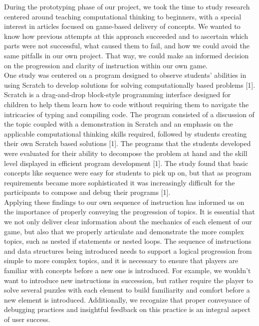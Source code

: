 During the prototyping phase of our project, we took the time to study research centered around teaching computational thinking to beginners, with a special interest in articles focused on game-based delivery of concepts. We wanted to know how previous attempts at this approach succeeded and to ascertain which parts were not successful, what caused them to fail, and how we could avoid the same pitfalls in our own project. That way, we could make an informed decision on the progression and clarity of instruction within our own game.\\

One study was centered on a program designed to observe students’ abilities in using Scratch to develop solutions for solving computationally based problems [1]. 
Scratch is a drag-and-drop block-style programming interface designed for children to help them learn how to code without requiring them to navigate the intricacies of typing and compiling code. The program consisted of a discussion of the topic coupled with a demonstration in Scratch and an emphasis on the applicable computational thinking skills required, followed by students creating their own Scratch based solutions [1]. The programs that the students developed were evaluated for their ability to decompose the problem at hand and the skill level displayed in efficient program development [1]. The study found that basic concepts like sequence were easy for students to pick up on, but that as program requirements became more sophisticated it was increasingly difficult for the participants to compose and debug their programs [1].\\

Applying these findings to our own sequence of instruction has informed us on the importance of properly conveying the progression of topics. It is essential that we not only deliver clear information about the mechanics of each element of our game, but also that we properly articulate and demonstrate the more complex topics, such as nested if statements or nested loops. The sequence of instructions and data structures being introduced needs to support a logical progression from simple to more complex topics, and it is necessary to ensure that players are familiar with concepts before a new one is introduced. For example, we wouldn’t want to introduce new instructions in succession, but rather require the player to solve several puzzles with each element to build familiarity and comfort before a new element is introduced.  Additionally, we recognize that proper conveyance of debugging practices and insightful feedback on this practice is an integral aspect of user success.\\

